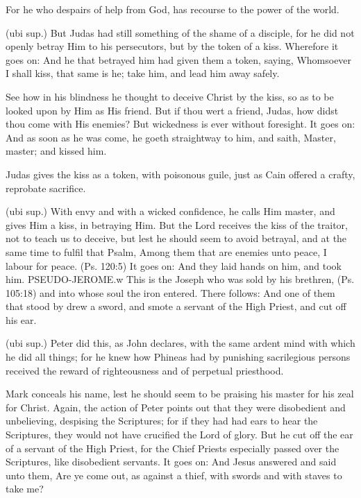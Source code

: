  For he who despairs of help from God, has recourse to the power of the world.

 (ubi sup.) But Judas had still something of the shame of a disciple, for he did not openly betray Him to his persecutors, but by the token of a kiss. Wherefore it goes on: And he that betrayed him had given them a token, saying, Whomsoever I shall kiss, that same is he; take him, and lead him away safely.

 See how in his blindness he thought to deceive Christ by the kiss, so as to be looked upon by Him as His friend. But if thou wert a friend, Judas, how didst thou come with His enemies? But wickedness is ever without foresight. It goes on: And as soon as he was come, he goeth straightway to him, and saith, Master, master; and kissed him.

 Judas gives the kiss as a token, with poisonous guile, just as Cain offered a crafty, reprobate sacrifice.

 (ubi sup.) With envy and with a wicked confidence, he calls Him master, and gives Him a kiss, in betraying Him. But the Lord receives the kiss of the traitor, not to teach us to deceive, but lest he should seem to avoid betrayal, and at the same time to fulfil that Psalm, Among them that are enemies unto peace, I labour for peace. (Ps. 120:5) It goes on: And they laid hands on him, and took him. PSEUDO-JEROME.w This is the Joseph who was sold by his brethren, (Ps. 105:18) and into whose soul the iron entered. There follows: And one of them that stood by drew a sword, and smote a servant of the High Priest, and cut off his ear.

 (ubi sup.) Peter did this, as John declares, with the same ardent mind with which he did all things; for he knew how Phineas had by punishing sacrilegious persons received the reward of righteousness and of perpetual priesthood.

 Mark conceals his name, lest he should seem to be praising his master for his zeal for Christ. Again, the action of Peter points out that they were disobedient and unbelieving, despising the Scriptures; for if they had had ears to hear the Scriptures, they would not have crucified the Lord of glory. But he cut off the ear of a servant of the High Priest, for the Chief Priests especially passed over the Scriptures, like disobedient servants. It goes on: And Jesus answered and said unto them, Are ye come out, as against a thief, with swords and with staves to take me?

